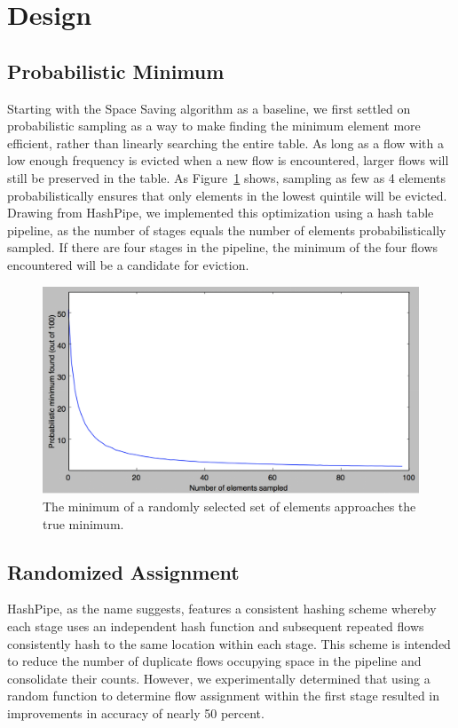 \section{Design}
\label{sec:design}
\subsection{Probabilistic Minimum}
Starting with the Space Saving algorithm as a baseline, we first settled on probabilistic sampling as a way to make finding the minimum element more efficient, rather than linearly searching the entire table. As long as a flow with a low enough frequency is evicted when a new flow is encountered, larger flows will still be preserved in the table. As Figure~\ref{fig:probMin} shows, sampling as few as 4 elements probabilistically ensures that only elements in the lowest quintile will be evicted. Drawing from HashPipe, we implemented this optimization using a hash table pipeline, as the number of stages equals the number of elements probabilistically sampled. If there are four stages in the pipeline, the minimum of the four flows encountered will be a candidate for eviction. 
\begin{figure}[t]
  \centering
    \includegraphics[scale=0.32]{probMin}
     \caption{The minimum of a randomly selected set of elements approaches the true minimum.}
     \label{fig:probMin}
\end{figure}
\subsection{Randomized Assignment}
HashPipe, as the name suggests, features a consistent hashing scheme whereby each stage uses an independent hash function and subsequent repeated flows consistently hash to the same location within each stage. This scheme is intended to reduce the number of duplicate flows occupying space in the pipeline and consolidate their counts. However, we experimentally determined that using a random function to determine flow assignment within the first stage resulted in improvements in accuracy of nearly 50 percent.
